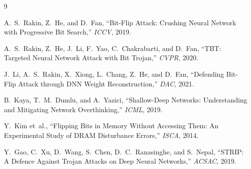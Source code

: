 \documentclass[12pt,a4paper]{article}
\begin{document}
\begin{thebibliography}{9}

A.~S.~Rakin, Z.~He, and D.~Fan,
``Bit-Flip Attack: Crushing Neural Network with Progressive Bit Search,''
\textit{ICCV}, 2019.

A.~S.~Rakin, Z.~He, J.~Li, F.~Yao, C.~Chakrabarti, and D.~Fan,
``TBT: Targeted Neural Network Attack with Bit Trojan,''
\textit{CVPR}, 2020.

J.~Li, A.~S.~Rakin, X.~Xiong, L.~Chang, Z.~He, and D.~Fan,
``Defending Bit-Flip Attack through DNN Weight Reconstruction,''
\textit{DAC}, 2021.

B.~Kaya, T.~M.~Dumlu, and A.~Yazici,
``Shallow-Deep Networks: Understanding and Mitigating Network Overthinking,''
\textit{ICML}, 2019.

Y.~Kim et~al.,
``Flipping Bits in Memory Without Accessing Them: An Experimental Study of DRAM Disturbance Errors,''
\textit{ISCA}, 2014.

Y.~Gao, C.~Xu, D.~Wang, S.~Chen, D.~C.~Ranasinghe, and S.~Nepal,
``STRIP: A Defence Against Trojan Attacks on Deep Neural Networks,''
\textit{ACSAC}, 2019.

\end{thebibliography}
\end{document}

